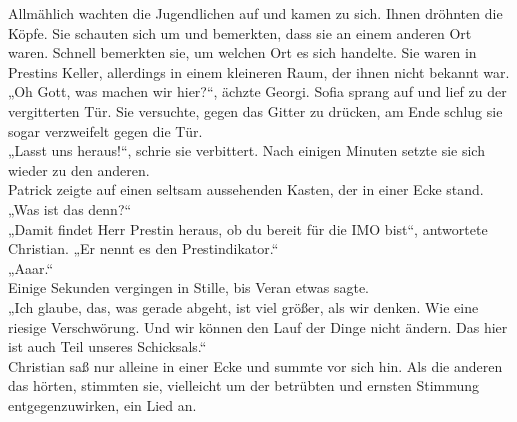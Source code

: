 \documentclass[oneside]{memoir}
\begin{document}
Allmählich wachten die Jugendlichen auf und kamen zu sich. Ihnen dröhnten die Köpfe. Sie schauten sich um und bemerkten, dass sie an einem anderen Ort waren. Schnell bemerkten sie, um welchen Ort es sich handelte. Sie waren in Prestins Keller, allerdings in einem kleineren Raum, der ihnen nicht bekannt war. \\
„Oh Gott, was machen wir hier?“, ächzte Georgi. 
Sofia sprang auf und lief zu der vergitterten Tür. Sie versuchte, gegen das Gitter zu drücken, am Ende schlug sie sogar verzweifelt gegen die Tür. \\
„Lasst uns heraus!“, schrie sie verbittert. Nach einigen Minuten setzte sie sich wieder zu den anderen. \\
Patrick zeigte auf einen seltsam aussehenden Kasten, der in einer Ecke stand. \\
„Was ist das denn?“ \\
„Damit findet Herr Prestin heraus, ob du bereit für die IMO bist“, antwortete Christian. „Er nennt es den Prestindikator.“ \\
„Aaar.“ \\
Einige Sekunden vergingen in Stille, bis Veran etwas sagte. \\
„Ich glaube, das, was gerade abgeht, ist viel größer, als wir denken. Wie eine riesige Verschwörung. Und wir können den Lauf der Dinge nicht ändern. Das hier ist auch Teil unseres Schicksals.“ \\
Christian saß nur alleine in einer Ecke und summte vor sich hin. Als die anderen das hörten, stimmten sie, vielleicht um der betrübten und ernsten Stimmung entgegenzuwirken, ein Lied an. \\
\end{document}
